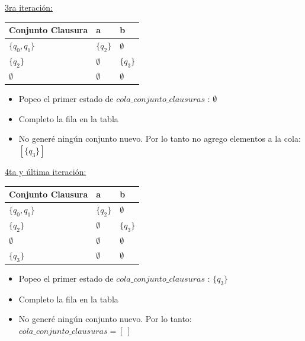 \underline{3ra iteración:}

\vspace{1 mm}

\begin{tabular}{ | l | l | l |}
  \hline
  Conjunto Clausura & a & b \\ \hline
  $\{q_{0},q_{1}\}$ & $\{q_{2}\}$ & $\emptyset$ \\ \hline
  $\{q_{2}\}$ & $\emptyset$ & $\{q_{3}\}$ \\ \hline
  $\emptyset$ & $\emptyset$ & $\emptyset$ \\ \hline
\end{tabular}

\begin{itemize}
  \item Popeo el primer estado de $cola\_conjunto\_clausuras$ : $\emptyset$
  \item Completo la fila en la tabla
  \item No generé ningún conjunto nuevo. Por lo tanto no agrego elementos a la cola: $[\{q_{3}\}]$
\end{itemize}

\vspace{2 mm}

\underline{4ta y última iteración:}

\vspace{1 mm}

\begin{tabular}{ | l | l | l |}
  \hline
  Conjunto Clausura & a & b \\ \hline
  $\{q_{0},q_{1}\}$ & $\{q_{2}\}$ & $\emptyset$ \\ \hline
  $\{q_{2}\}$ & $\emptyset$ & $\{q_{3}\}$ \\ \hline
  $\emptyset$ & $\emptyset$ & $\emptyset$ \\ \hline
  $\{q_{3}\}$ & $\emptyset$ & $\emptyset$ \\ \hline
\end{tabular}

\begin{itemize}
  \item Popeo el primer estado de $cola\_conjunto\_clausuras$ : $\{q_{3}\}$
  \item Completo la fila en la tabla
  \item No generé ningún conjunto nuevo. Por lo tanto: $cola\_conjunto\_clausuras = [ \ ]$
\end{itemize}

\vspace{2 mm}


